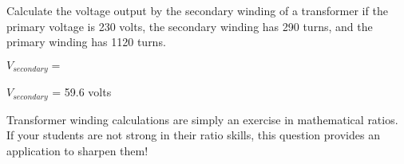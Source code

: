 

Calculate the voltage output by the secondary winding of a transformer if the primary voltage is 230 volts, the secondary winding has 290 turns, and the primary winding has 1120 turns.

\vskip 10pt

$V_{secondary} =$

\vskip 10pt







$V_{secondary}$ = 59.6 volts 







Transformer winding calculations are simply an exercise in mathematical ratios.  If your students are not strong in their ratio skills, this question provides an application to sharpen them!




